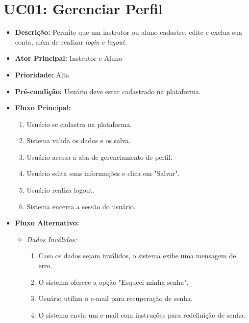         \section*{UC01: Gerenciar Perfil}

        \begin{itemize}
            \item \textbf{Descrição:} Permite que um instrutor ou aluno cadastre, edite e exclua sua conta, além de realizar \textit{login} e \textit{logout}.
            
            \item \textbf{Ator Principal:} Instrutor e Aluno
            
            \item \textbf{Prioridade:} Alta
            
            \item \textbf{Pré-condição:} Usuário deve estar cadastrado na plataforma.
            
            \item \textbf{Fluxo Principal:}
            \begin{enumerate}
                \item Usuário se cadastra na plataforma.
                \item Sistema valida os dados e os salva.
                \item Usuário acessa a aba de gerenciamento de perfil.
                \item Usuário edita suas informações e clica em "Salvar".
                \item Usuário realiza logout.
                \item Sistema encerra a sessão do usuário.
            \end{enumerate}

            \item \textbf{Fluxo Alternativo:}
            \begin{itemize}
                \item \textit{Dados Inválidos:}
                \begin{enumerate}
                    \item Caso os dados sejam inválidos, o sistema exibe uma mensagem de erro.
                    \item O sistema oferece a opção "Esqueci minha senha".
                    \item Usuário utiliza o e-mail para recuperação de senha.
                    \item O sistema envia um e-mail com instruções para redefinição de senha.
                \end{enumerate}
            \end{itemize}
        \end{itemize}

